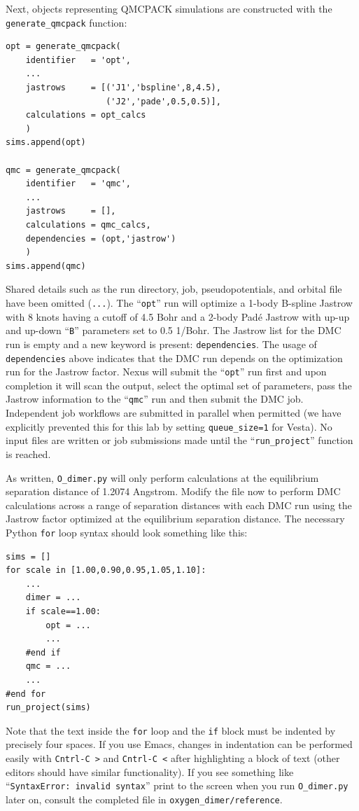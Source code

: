 Next, objects representing QMCPACK simulations are constructed with the \texttt{generate\_qmcpack} function:
\begin{lstlisting}
opt = generate_qmcpack(
    identifier   = 'opt',
    ...
    jastrows     = [('J1','bspline',8,4.5), 
                    ('J2','pade',0.5,0.5)],
    calculations = opt_calcs
    )
sims.append(opt)

qmc = generate_qmcpack(
    identifier   = 'qmc',
    ...
    jastrows     = [],            
    calculations = qmc_calcs,
    dependencies = (opt,'jastrow') 
    )
sims.append(qmc)
\end{lstlisting}
\noindent
Shared details such as the run directory, job, pseudopotentials, and orbital file have been omitted (\texttt{...}).  The ``\texttt{opt}'' run will optimize a 1-body B-spline Jastrow with 8 knots having a cutoff of 4.5 Bohr and a 2-body Pad\'{e} Jastrow with up-up and up-down ``\texttt{B}'' parameters set to 0.5 1/Bohr.  The Jastrow list for the DMC run is empty and a new keyword is present: \texttt{dependencies}.  The usage of \texttt{dependencies} above indicates that the DMC run depends on the optimization run for the Jastrow factor.  Nexus will submit the ``\texttt{opt}'' run first and upon completion it will scan the output, select the optimal set of parameters, pass the Jastrow information to the ``\texttt{qmc}'' run and then submit the DMC job.  Independent job workflows are submitted in parallel when permitted (we have explicitly prevented this for this lab by setting \texttt{queue\_size=1} for Vesta).  No input files are written or job submissions made until the ``\texttt{run\_project}'' function is reached.

As written, \texttt{O\_dimer.py} will only perform calculations at the equilibrium separation distance of 1.2074 Angstrom.  Modify the file now to perform DMC calculations across a range of separation distances with each DMC run using the Jastrow factor optimized at the equilibrium separation distance.  The necessary Python \texttt{for} loop syntax should look something like this:
\begin{lstlisting}
sims = []
for scale in [1.00,0.90,0.95,1.05,1.10]:
    ...
    dimer = ...
    if scale==1.00:
        opt = ...
        ...
    #end if
    qmc = ...
    ...
#end for
run_project(sims)
\end{lstlisting}
\noindent
Note that the text inside the \texttt{for} loop and the \texttt{if} block must be indented by precisely four spaces.  If you use Emacs, changes in indentation can be performed easily with \texttt{Cntrl-C >} and \texttt{Cntrl-C <} after highlighting a block of text (other editors should have similar functionality).  If you see something like  ``\texttt{SyntaxError: invalid syntax}'' print to the screen when you run \texttt{O\_dimer.py} later on, consult the completed file in \texttt{oxygen\_dimer/reference}.


